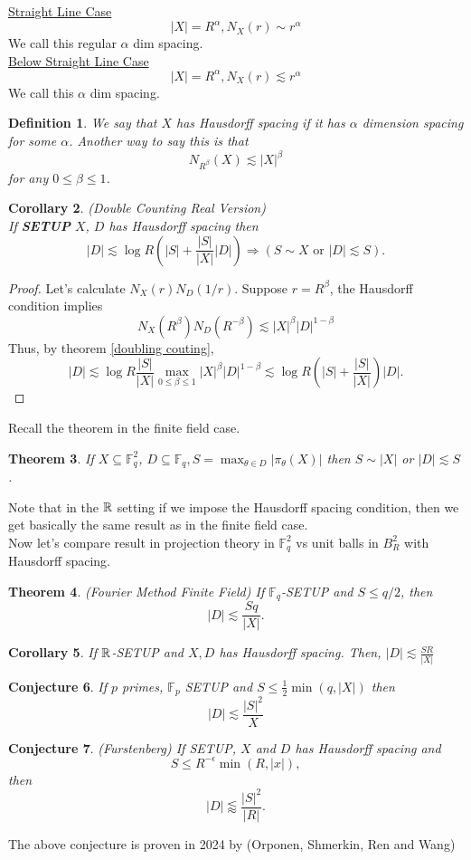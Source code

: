 \documentclass[12pt]{amsart}
\newtheorem{theorem}{Theorem}[section]
\newtheorem{conj}[theorem]{Conjecture}
\newtheorem{Definition}[theorem]{Definition}
\newtheorem{Corollary}[theorem]{Corollary}
\newcommand{\F}{\mathbb{F}}
\begin{document}
\underline{Straight Line Case }\\
$$|X|=R^\alpha, N_X(r)\sim r^\alpha$$
We call this regular $\alpha$ dim spacing. \\
\underline{Below Straight Line Case }\\
$$|X|=R^\alpha, N_X(r)\lesssim r^\alpha$$
We call this $\alpha$ dim spacing. \\
\begin{Definition}
We say that $X$ has Hausdorff spacing if it has $\alpha$ dimension spacing for some $\alpha$. Another way to say this is that 
$$N_{R^\beta}(X)\lesssim |X|^\beta$$
for any $0\leq \beta \leq 1$. 
\end{Definition}
\begin{Corollary}(Double Counting Real Version)\\
    If \textbf{SETUP} $X$, $D$ has Hausdorff spacing then 
    $$|D|\lesssim \log R (|S|+\frac{|S|}{|X|}|D|) \Rightarrow (S \sim X \text{ or }|D| \lesssim S).$$
\end{Corollary}
\begin{proof}
    Let's calculate $N_X(r)N_D(1/r)$. Suppose $r=R^\beta$, the Hausdorff condition implies
    $$N_X(R^\beta)N_D(R^{-\beta})\lesssim |X|^\beta |D|^{1-\beta}$$
    Thus, by theorem \ref{doubling couting}, 
    $$|D| \lesssim \log R\frac{|S|}{|X|}\max_{0\leq \beta \leq 1}|X|^\beta |D|^{1-\beta}\lesssim \log R(|S|+\frac{|S|}{|X|})|D|.$$
\end{proof}
Recall the theorem in the finite field case. 
\begin{theorem}
 If $X \subseteq \F_q^2$, $D \subseteq \F_q, S=\max_{\theta\in D}|\pi_\theta(X)|$ then $S \sim |X|$ or $|D|\lesssim S$.    
\end{theorem}
Note that in the $\mathbb{R}$ setting if we impose the Hausdorff spacing condition, then we get basically the same result as in the finite field case. \\
Now let's compare result in projection theory in $\F_q^2$ vs unit balls in $B_R^2$ with Hausdorff spacing. 
\begin{theorem}(Fourier Method Finite Field)
    If $\F_q$-SETUP and $S \leq q/2$, then 
    $$|D|\lesssim \frac{Sq}{|X|}. $$
\end{theorem}
\begin{Corollary}
    If $\mathbb{R}$-SETUP and $X,D$ has Hausdorff spacing. Then, $|D|\lesssim \frac{SR}{|X|}$
\end{Corollary}
\begin{conj}
    If $p $ primes, $\F_p$ SETUP and $S \leq \frac{1}{2}\min(q,|X|)$ then $$|D| \lesssim \frac{|S|^2}{X}$$
\end{conj}
\begin{conj}(Furstenberg)
   If SETUP, $X$ and $D$ has Hausdorff spacing  and 
   $$S \leq R^{-\epsilon}\min(R,|x|),$$
   then $$|D|\lessapprox \frac{|S|^2}{|R|}.$$
\end{conj}
The above conjecture is proven in 2024 by (Orponen, Shmerkin, Ren and Wang) 
\end{document}
